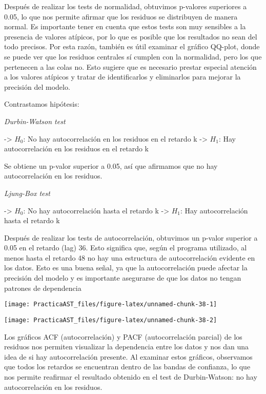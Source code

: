\documentclass[
]{article}
\begin{document}
Después de realizar los tests de normalidad, obtuvimos p-valores
superiores a 0.05, lo que nos permite afirmar que los residuos se
distribuyen de manera normal. Es importante tener en cuenta que estos
tests son muy sensibles a la presencia de valores atípicos, por lo que
es posible que los resultados no sean del todo precisos. Por esta razón,
también es útil examinar el gráfico QQ-plot, donde se puede ver que los
residuos centrales sí cumplen con la normalidad, pero los que pertenecen
a las colas no. Esto sugiere que es necesario prestar especial atención
a los valores atípicos y tratar de identificarlos y eliminarlos para
mejorar la precisión del modelo.

\medskip

Contrastamos hipótesis:

\emph{Durbin-Watson test}

-\textgreater{} \(H_0\): No hay autocorrelación en los residuos en el
retardo k -\textgreater{} \(H_1\): Hay autocorrelación en los residuos
en el retardo k

Se obtiene un p-valor superior a 0.05, así que afirmamos que no hay
autocorrelación en los residuos.

\emph{Ljung-Box test}

-\textgreater{} \(H_0\): No hay autocorrelación hasta el retardo k
-\textgreater{} \(H_1\): Hay autocorrelación hasta el retardo k

Después de realizar los tests de autocorrelación, obtuvimos un p-valor
superior a 0.05 en el retardo (lag) 36. Esto significa que, según el
programa utilizado, al menos hasta el retardo 48 no hay una estructura
de autocorrelación evidente en los datos. Esto es una buena señal, ya
que la autocorrelación puede afectar la precisión del modelo y es
importante asegurarse de que los datos no tengan patrones de dependencia

\medskip

\begin{center}\texttt{[image: PracticaAST\_files/figure-latex/unnamed-chunk-38-1]} \end{center}

\begin{center}\texttt{[image: PracticaAST\_files/figure-latex/unnamed-chunk-38-2]} \end{center}

Los gráficos ACF (autocorrelación) y PACF (autocorrelación parcial) de
los residuos nos permiten visualizar la dependencia entre los datos y
nos dan una idea de si hay autocorrelación presente. Al examinar estos
gráficos, observamos que todos los retardos se encuentran dentro de las
bandas de confianza, lo que nos permite reafirmar el resultado obtenido
en el test de Durbin-Watson: no hay autocorrelación en los residuos.
\end{document}
